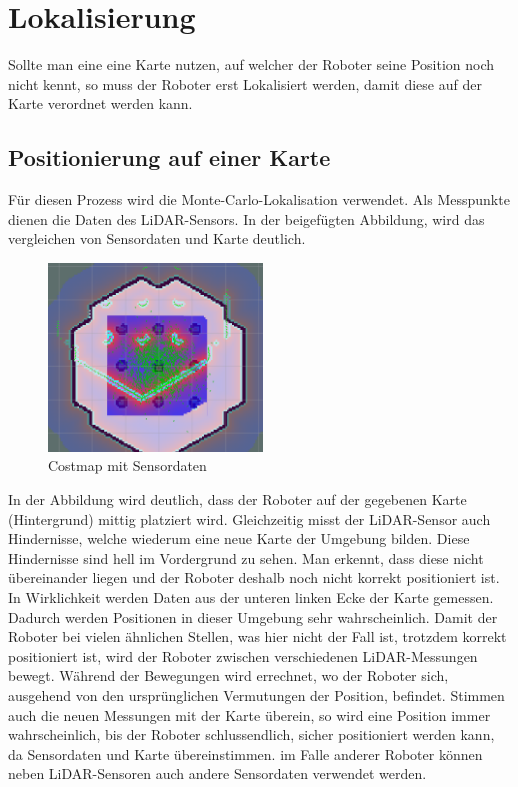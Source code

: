 \section{Lokalisierung}
{	
	Sollte man eine eine Karte nutzen, auf welcher der Roboter seine Position noch nicht kennt, so muss der Roboter erst Lokalisiert werden, damit diese auf der Karte verordnet werden kann.
	\subsection{Positionierung auf einer Karte}
	{
		
	Für diesen Prozess wird die Monte-Carlo-Lokalisation verwendet. Als Messpunkte dienen die Daten des LiDAR-Sensors. In der beigefügten Abbildung, wird das vergleichen von Sensordaten und Karte deutlich.
		\begin{figure}[H]
			\centering
			\includegraphics[height=5cm]{Bilder/costmap_monte_carlo_example.png}
			\caption{Costmap mit Sensordaten} 
			\label{pic:coastmontecarlo}
		\end{figure}
		In der Abbildung wird deutlich, dass der Roboter auf der gegebenen Karte (Hintergrund) mittig platziert wird. Gleichzeitig misst der LiDAR-Sensor auch Hindernisse, welche wiederum eine neue Karte der Umgebung bilden. Diese Hindernisse sind hell im Vordergrund zu sehen. Man erkennt, dass diese nicht übereinander liegen und der Roboter deshalb noch nicht korrekt positioniert ist. In Wirklichkeit werden Daten aus der unteren linken Ecke der Karte gemessen. Dadurch werden Positionen in dieser Umgebung sehr wahrscheinlich. Damit der Roboter bei vielen ähnlichen Stellen, was hier nicht der Fall ist, trotzdem korrekt positioniert ist, wird der Roboter zwischen verschiedenen LiDAR-Messungen bewegt. Während der Bewegungen wird errechnet, wo der Roboter sich, ausgehend von den ursprünglichen Vermutungen der Position, befindet. Stimmen auch die neuen Messungen mit der Karte überein, so wird eine Position immer wahrscheinlich, bis der Roboter schlussendlich, sicher positioniert werden kann, da Sensordaten und Karte übereinstimmen. im Falle anderer Roboter können neben LiDAR-Sensoren auch andere Sensordaten verwendet werden.
		
}}
